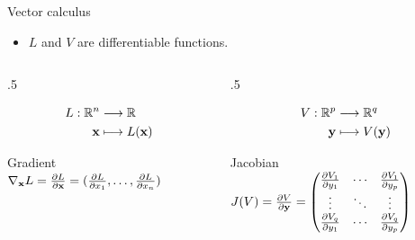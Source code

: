 \documentclass[xcolor=pdftex,dvipsnames,table,mathserif,aspectratio=169]{beamer}
\begin{document}
\begin{frame}{Vector calculus}

\begin{itemize}
\item $L$ and $V$ are differentiable functions.
\end{itemize}

  \begin{columns}
    \begin{column}{.5\textwidth}

      \begin{equation*}
    \begin{split}
      L: \mathbb{R}^n & \longrightarrow \mathbb{R}\\
      \mathbf{x}      & \longmapsto L(\mathbf{x})
    \end{split}
  \end{equation*}

  \begin{block}{Gradient}
        \centering
        $\nabla_{\mathbf{x}} L = \frac{\partial L}{\partial \mathbf{x}} = (\frac{\partial L}{\partial x_1}, \ldots, \frac{\partial L}{\partial x_n}) $
      \end{block}
    \end{column}

\pause

    \begin{column}{.5\textwidth}

      \begin{equation*}
    \begin{split}
      V: \mathbb{R}^p & \longrightarrow \mathbb{R}^q\\
      \mathbf{y}      & \longmapsto V(\mathbf{y})
    \end{split}
  \end{equation*}

  \begin{block}{Jacobian}
        \centering
        $J(V) = \frac{\partial V}{\partial \mathbf{y}} =
        \begin{pmatrix}
          \frac{\partial V_1}{\partial y_1} & \cdots & \frac{\partial V_1}{\partial y_p}  \\
          \vdots  & \ddots & \vdots  \\
          \frac{\partial V_q}{\partial y_1} & \cdots & \frac{\partial V_q}{\partial y_p}
        \end{pmatrix}
        $
      \end{block}
    \end{column}
  \end{columns}

\end{frame}
\end{document}
